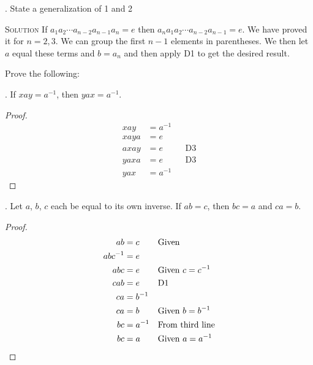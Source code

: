 \documentclass[twoside]{amsart}
\newcommand{\Solution}{\textsc{Solution}\xspace}
\begin{document}
\begin{enumerate}[A.]
   . State a generalization of 1 and 2
   
   \noindent \Solution If $a_1 a_2 \cdots a_{n-2} a_{n-1} a_n=e$ then 
   $a_n a_1 a_2 \cdots a_{n-2} a_{n-1}=e$. We have proved it for
   $n=2,3$. We can group the first
   $n-1$ elements in parentheses. We then let $a$ equal these terms
   and $b=a_n$ and then apply D1 to get the desired
   result.

   \noindent Prove the following:

   . If $xay=a^{-1}$, then $yax=a^{-1}$.
   \begin{proof}
      \begin{align*}
         xay  & = a^{-1} \\
	 xaya & = e \\
	 axay & = e && \text{D3} \\
	 yaxa & = e && \text{D3} \\
	 yax  & = a^{-1}
      \end{align*}
   \end{proof}

   . Let $a$, $b$, $c$ each be equal to its own inverse.
   If $ab=c$, then $bc=a$ and $ca=b$.
   \begin{proof}
      \begin{align*}
         ab & = c    && \text{Given} \\
	 abc^{-1} & = e \\
	 abc      & = e && \text{Given $c=c^{-1}$} \\
	 cab      & = e && \text{D1}\\
	 ca       & = b^{-1} \\ 
	 ca       & = b  && \text{Given $b=b^{-1}$}\\
	 bc       & = a^{-1} && \text{From third line}\\
	 bc       & = a      && \text{Given $a=a^{-1}$} \qedhere
      \end{align*}
   \end{proof}
   

\end{enumerate}
\end{document}
